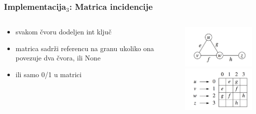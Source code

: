 \documentclass[compress]{beamer}
\begin{document}
\begin{frame}[fragile]
  \frametitle{Implementacija$_3$: Matrica incidencije}
  \begin{columns}
    \begin{column}[t]{6cm}
      \begin{itemize}
        \item svakom čvoru dodeljen int ključ
        \item matrica sadrži referencu na granu ukoliko ona povezuje
          dva čvora, ili None
        \item ili samo 0/1 u matrici
      \end{itemize}
    \end{column}
    \begin{column}[t]{6cm}
      \begin{center}
        \includegraphics[width=5cm]{asp-14-pic12.png} \\
        \includegraphics[width=5cm]{asp-14-pic13.png}
      \end{center}
    \end{column}
  \end{columns}
\end{frame}
\end{document}
